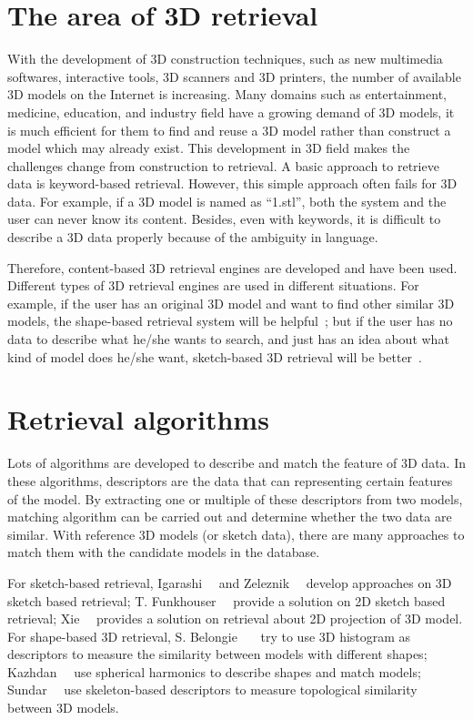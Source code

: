 \section{The area of 3D retrieval} \label{sec:3dretrieval}

With the development of 3D construction techniques, such as new multimedia softwares, interactive tools, 3D scanners and 3D printers, the number of available 3D models on the Internet is increasing. Many domains such as entertainment, medicine, education, and industry field have a growing demand of 3D models, it is much efficient for them to find and reuse a 3D model rather than construct a model which may already exist. This development in 3D field makes the challenges change from construction to retrieval. A basic approach to retrieve data is keyword-based retrieval. However, this simple approach often fails for 3D data. For example, if a 3D model is named as ``1.stl'', both the system and the user can never know its content. Besides, even with keywords, it is difficult to describe a 3D data properly because of the ambiguity in language. 

Therefore, content-based 3D retrieval engines are developed and have been used. Different types of 3D retrieval engines are used in different situations. For example, if the user has an original 3D model and want to find other similar 3D models, the shape-based retrieval system will be helpful~\cite{Funkhouser:2003:SEM:588272.588279}; but if the user has no data to describe what he/she wants to search, and just has an idea about what kind of model does he/she want, sketch-based 3D retrieval will be better~\cite{CGF:CGF12200}. 

\section{Retrieval algorithms} \label{sec:retrievalalgorithms}

Lots of algorithms are developed to describe and match the feature of 3D data. In these algorithms, descriptors are the data that can representing certain features of the model. By extracting one or multiple of these descriptors from two models, matching algorithm can be carried out and determine whether the two data are similar. With reference 3D models (or sketch data), there are many approaches to match them with the candidate models in the database. 

For sketch-based retrieval, Igarashi~\etal~\cite{Igarashi:2007:TSI:1281500.1281532} and Zeleznik~\etal~\cite{Zeleznik:2007:SIS:1281500.1281530} develop approaches on 3D sketch based retrieval; T. Funkhouser~\etal~\cite{Funkhouser:2003:SEM:588272.588279} provide a solution on 2D sketch based retrieval; Xie~\etal~\cite{CGF:CGF12200} provides a solution on retrieval about 2D projection of 3D model. For shape-based 3D retrieval, S. Belongie~\etal~\cite{belongie2001matching}~\cite{belongie2002shape} try to use 3D histogram as descriptors to measure the similarity between models with different shapes; Kazhdan~\etal~\cite{kazhdan2003rotation} use spherical harmonics to describe shapes and match models; Sundar~\etal~\cite{sundar2003skeleton} use skeleton-based descriptors to measure topological similarity between 3D models. 

